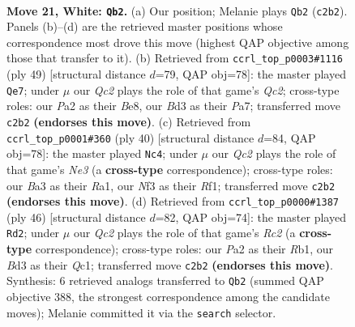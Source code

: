 \documentclass[11pt]{article}
\begin{document}
\clearpage

\begin{figure}[p]\centering
\begin{subfigure}{0.46\textwidth}\centering
\resizebox{\linewidth}{!}{%
\newchessgame
\chessboard[
  setfen={rnbqr2k/5p2/1p2pnp1/7p/p2P4/B1PB1NPP/P1Q2P2/3RR1K1 w - - 5 21},
  showmover=false,
  pgfstyle=straightmove, color=movearrow, markmove={c2-b2}
]}
\caption{}
\end{subfigure}\hfill
\begin{subfigure}{0.46\textwidth}\centering
\resizebox{\linewidth}{!}{%
\newchessgame
\chessboard[
  setfen={2rrb1k1/p1q2pp1/Pp2pn1p/8/2PP4/3BQN1P/5PP1/R2R2K1 b - - 2 25},
  showmover=false,
  pgfstyle=straightmove, color=movearrow, markmove={c7-e7}
]}
\caption{}
\end{subfigure}
\\[4pt]
\begin{subfigure}{0.46\textwidth}\centering
\resizebox{\linewidth}{!}{%
\newchessgame
\chessboard[
  setfen={2r2rk1/pb1q2p1/1pn1p2p/5p2/P2P1P2/2PBN2P/4Q1P1/R4RK1 w - - 2 21},
  showmover=false,
  pgfstyle=straightmove, color=movearrow, markmove={e3-c4}
]}
\caption{}
\end{subfigure}\hfill
\begin{subfigure}{0.46\textwidth}\centering
\resizebox{\linewidth}{!}{%
\newchessgame
\chessboard[
  setfen={r3r1k1/1b2qpp1/7p/1Pnp4/2pN4/p3P3/P1R1BPPP/1RQ3K1 w - - 2 24},
  showmover=false,
  pgfstyle=straightmove, color=movearrow, markmove={c2-d2}
]}
\caption{}
\end{subfigure}
\caption{\textbf{Move 21, White: \texttt{Qb2}.} (a) Our position; Melanie plays \texttt{Qb2} (\texttt{c2b2}). Panels (b)--(d) are the retrieved master positions whose correspondence most drove this move (highest QAP objective among those that transfer to it). (b) Retrieved from \texttt{ccrl\_top\_p0003\#1116} (ply 49) [structural distance $d$=79, QAP obj=78]: the master played \texttt{Qe7}; under $\mu$ our \emph{Qc2} plays the role of that game's \emph{Qc2}; cross-type roles: our \emph{P}a2 as their \emph{B}e8, our \emph{B}d3 as their \emph{P}a7; transferred move \texttt{c2b2} \textbf{(endorses this move)}. (c) Retrieved from \texttt{ccrl\_top\_p0001\#360} (ply 40) [structural distance $d$=84, QAP obj=78]: the master played \texttt{Nc4}; under $\mu$ our \emph{Qc2} plays the role of that game's \emph{Ne3} (a \textbf{cross-type} correspondence); cross-type roles: our \emph{B}a3 as their \emph{R}a1, our \emph{N}f3 as their \emph{R}f1; transferred move \texttt{c2b2} \textbf{(endorses this move)}. (d) Retrieved from \texttt{ccrl\_top\_p0000\#1387} (ply 46) [structural distance $d$=82, QAP obj=74]: the master played \texttt{Rd2}; under $\mu$ our \emph{Qc2} plays the role of that game's \emph{Rc2} (a \textbf{cross-type} correspondence); cross-type roles: our \emph{P}a2 as their \emph{R}b1, our \emph{B}d3 as their \emph{Q}c1; transferred move \texttt{c2b2} \textbf{(endorses this move)}. Synthesis: 6 retrieved analogs transferred to \texttt{Qb2} (summed QAP objective 388, the strongest correspondence among the candidate moves); Melanie committed it via the \texttt{search} selector.}
\label{fig:thought-m40}
\end{figure}
\end{document}

